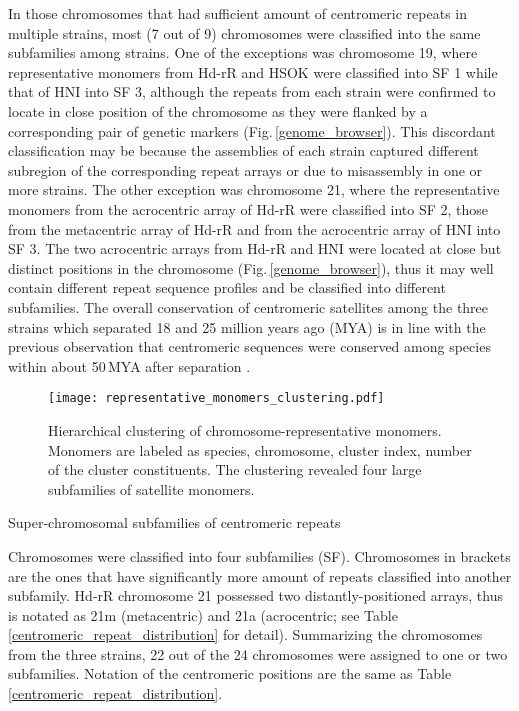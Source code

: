   In those chromosomes that had sufficient amount of centromeric repeats in multiple strains, most (7 out of 9) chromosomes were classified into the same subfamilies among strains. One of the exceptions was chromosome 19, where representative monomers from Hd-rR and HSOK were classified into SF 1 while that of HNI into SF 3, although the repeats from each strain were confirmed to locate in close position of the chromosome as they were flanked by a corresponding pair of genetic markers (Fig.\,\ref{genome_browser}). This discordant classification may be because the assemblies of each strain captured different subregion of the corresponding repeat arrays or due to misassembly in one or more strains. The other exception was chromosome 21, where the representative monomers from the acrocentric array of Hd-rR were classified into SF 2, those from the metacentric array of Hd-rR and from the acrocentric array of HNI into SF 3. The two acrocentric arrays from Hd-rR and HNI were located at close but distinct positions in the chromosome (Fig.\,\ref{genome_browser}), thus it may well contain different repeat sequence profiles and be classified into different subfamilies. The overall conservation of centromeric satellites among the three strains which separated 18 and 25 million years ago (MYA) is in line with the previous observation that centromeric sequences were conserved among species within about 50\,MYA after separation \cite{Melters2013}.

  \begin{figure*}
    \centering
    \texttt{[image: representative\_monomers\_clustering.pdf]}
    \caption{
      Hierarchical clustering of chromosome-representative monomers. Monomers are labeled as species, chromosome, cluster index, number of the cluster constituents. The clustering revealed four large subfamilies of satellite monomers.
    }
    \label{monomer_clustering}
  \end{figure*}

  \begin{table*}
    \centering
    \caption{Super-chromosomal subfamilies of centromeric repeats}
    
    \label{super_chromosomal_subfamily}
    \caption*{{\small
      Chromosomes were classified into four subfamilies (SF). Chromosomes in brackets are the ones that have significantly more amount of repeats classified into another subfamily. Hd-rR chromosome 21 possessed two distantly-positioned arrays, thus is notated as 21m (metacentric) and 21a (acrocentric; see Table \ref{centromeric_repeat_distribution} for detail). Summarizing the chromosomes from the three strains, 22 out of the 24 chromosomes were assigned to one or two subfamilies. Notation of the centromeric positions are the same as Table \ref{centromeric_repeat_distribution}.
    }}
  \end{table*}


